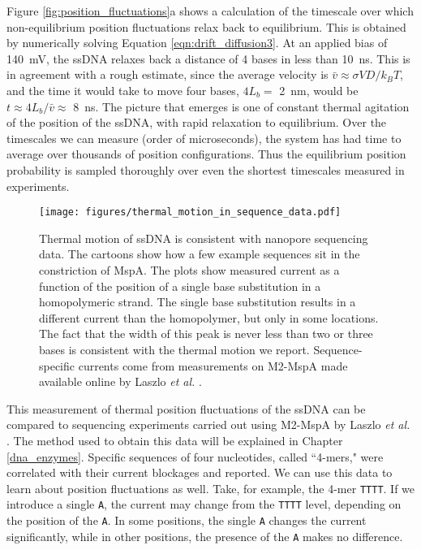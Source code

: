 Figure \ref{fig:position_fluctuations}a shows a calculation of the timescale over which non-equilibrium position fluctuations relax back to equilibrium.  This is obtained by numerically solving Equation \ref{eqn:drift_diffusion3}.  At an applied bias of \SI{140}{\mV}, the ssDNA relaxes back a distance of 4 bases in less than \SI{10}{\ns}.  This is in agreement with a rough estimate, since the average velocity is $\bar{v} \approx \sigma V D / k_B T$, and the time it would take to move four bases, $4 L_b = $ \SI{2}{\nm}, would be $t \approx 4 L_b / \bar{v} \approx $ \SI{8}{\ns}.  The picture that emerges is one of constant thermal agitation of the position of the ssDNA, with rapid relaxation to equilibrium.  Over the timescales we can measure (order of microseconds), the system has had time to average over thousands of position configurations.  Thus the equilibrium position probability is sampled thoroughly over even the shortest timescales measured in experiments.

\begin{figure}[h] %
\begin{centering}
\texttt{[image: figures/thermal\_motion\_in\_sequence\_data.pdf]}
\caption[Thermal motion averaging and sequencing data]{Thermal motion of ssDNA is consistent with nanopore sequencing data.  The cartoons show how a few example sequences sit in the constriction of MspA.  The plots show measured current as a function of the position of a single base substitution in a homopolymeric strand.  The single base substitution results in a different current than the homopolymer, but only in some locations.  The fact that the width of this peak is never less than two or three bases is consistent with the thermal motion we report.  Sequence-specific currents come from measurements on M2-MspA made available online by Laszlo \textit{et al.} \citep{Laszlo2014}.}
\label{fig:thermal_motion_sequencing}
\end{centering}
\end{figure}

This measurement of thermal position fluctuations of the ssDNA can be compared to sequencing experiments carried out using M2-MspA by Laszlo \textit{et al.} \citep{Laszlo2014}.  The method used to obtain this data will be explained in Chapter \ref{dna_enzymes}.  Specific sequences of four nucleotides, called ``4-mers," were correlated with their current blockages and reported.  We can use this data to learn about position fluctuations as well.  Take, for example, the 4-mer \texttt{TTTT}.  If we introduce a single \texttt{A}, the current may change from the \texttt{TTTT} level, depending on the position of the \texttt{A}.  In some positions, the single \texttt{A} changes the current significantly, while in other positions, the presence of the \texttt{A} makes no difference.

